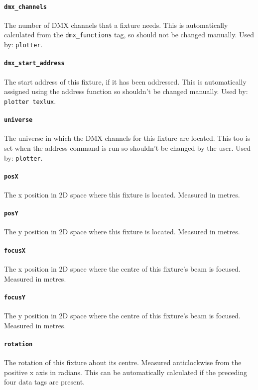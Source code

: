 \documentclass[a4paper]{article}
\begin{document}
\paragraph{\texttt{dmx\_channels}}
The number of DMX channels that a fixture needs. This is automatically 
calculated from the \texttt{dmx\_functions} tag, so should not be changed 
manually. Used by: \texttt{plotter}.

\paragraph{\texttt{dmx\_start\_address}}
The start address of this fixture, if it has been addressed. This is 
automatically assigned using the address function so shouldn't be changed 
manually. Used by: \texttt{plotter texlux}.

\paragraph{\texttt{universe}}
The universe in which the DMX channels for this fixture are located. This too 
is set when the address command is run so shouldn't be changed by the user. 
Used by: \texttt{plotter}.

\paragraph{\texttt{posX}}
The x position in 2D space where this fixture is located. Measured in metres.

\paragraph{\texttt{posY}}
The y position in 2D space where this fixture is located. Measured in metres.

\paragraph{\texttt{focusX}}
The x position in 2D space where the centre of this fixture's beam is 
focused. Measured in metres.

\paragraph{\texttt{focusY}}
The y position in 2D space where the centre of this fixture's beam is 
focused. Measured in metres.

\paragraph{\texttt{rotation}}
The rotation of this fixture about its centre. Measured anticlockwise from 
the positive x axis in radians. This can be automatically calculated if the 
preceding four data tags are present.
\end{document}
